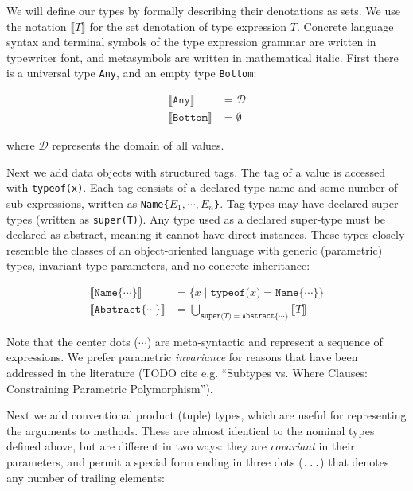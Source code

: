 We will define our types by formally describing their denotations as sets.
We use the notation $\llbracket T \rrbracket$ for the set denotation of
type expression $T$.
Concrete language syntax and terminal symbols of the type expression grammar
are written in typewriter font, and metasymbols are written in mathematical italic.
First there is a universal type \texttt{Any}, and an empty type \texttt{Bottom}:

\begin{align*}
  \llbracket \texttt{Any} \rrbracket &= \mathcal{D} \\
  \llbracket \texttt{Bottom} \rrbracket &= \emptyset
\end{align*}

where $\mathcal{D}$ represents the domain of all values.

Next we add data objects with structured tags.
The tag of a value is accessed with \texttt{typeof(x)}.
Each tag consists of a declared type name and some number of sub-expressions,
written as \texttt{Name\{}$E_1, \cdots, E_n$\texttt{\}}.
Tag types may have declared super-types (written as \texttt{super(T)}).
Any type used as a declared super-type must be declared as abstract, meaning it
cannot have direct instances.
These types closely resemble the classes of an object-oriented language with
generic (parametric) types, invariant type parameters, and no concrete inheritance:

\begin{align*}
  \llbracket \texttt{Name\{}\cdots\texttt{\}} \rrbracket &= \{ x\mid \texttt{typeof(}x\texttt{)} = \texttt{Name\{}\cdots\texttt{\}} \} \\
  \llbracket \texttt{Abstract\{}\cdots\texttt{\}} \rrbracket &= \bigcup_{\texttt{super(}T\texttt{)} = \texttt{Abstract\{}\cdots\texttt{\}}} \llbracket T \rrbracket
\end{align*}

Note that the center dots ($\cdots$) are meta-syntactic and represent a sequence of
expressions.
We prefer parametric \emph{invariance} for reasons that have been addressed in the
literature (TODO cite e.g. ``Subtypes vs. Where Clauses: Constraining Parametric Polymorphism'').

Next we add conventional product (tuple) types, which are useful for representing the
arguments to methods. These are almost identical to the nominal types defined above,
but are different in two ways: they are \emph{covariant} in their parameters, and permit
a special form ending in three dots (\texttt{...}) that denotes any number of trailing
elements:

